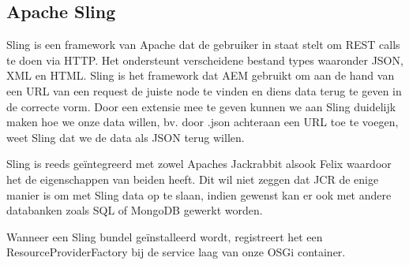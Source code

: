 
	\subsection{Apache Sling}
	Sling is een framework van Apache dat de gebruiker in staat stelt om REST calls te doen via HTTP. Het ondersteunt verscheidene bestand types waaronder JSON, XML en HTML. Sling is het framework dat AEM gebruikt om aan de hand van een URL van een request de juiste node te vinden en diens data terug te geven in de correcte vorm. Door een extensie mee te geven kunnen we aan Sling duidelijk maken hoe we onze data willen, bv. door \textquotedbl .json\textquotedbl{} achteraan een URL toe te voegen, weet Sling dat we de data als JSON terug willen.
	\par
	Sling is reeds ge\"integreerd met zowel Apaches Jackrabbit alsook Felix waardoor het de eigenschappen van beiden heeft. Dit wil niet zeggen dat JCR de enige manier is om met Sling data op te slaan, indien gewenst kan er ook met andere databanken zoals SQL of MongoDB gewerkt worden. 
	\par
	 Wanneer een Sling bundel ge\"installeerd wordt, registreert het een ResourceProviderFactory bij de service laag van onze OSGi container.  
